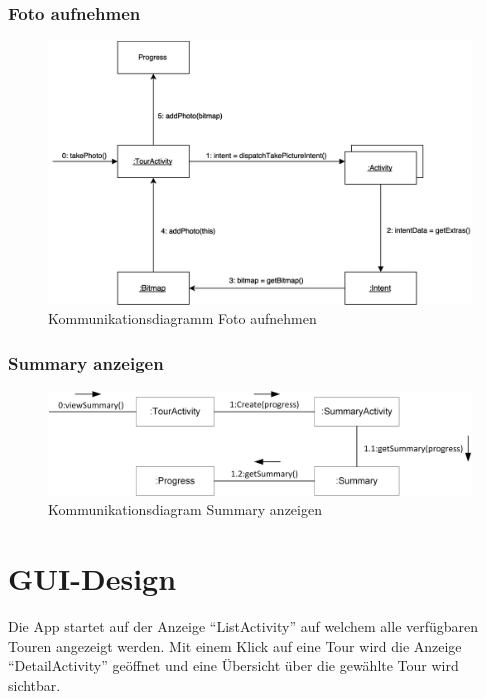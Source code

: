 \documentclass[a4paper,10pt,xetex]{article}
\begin{document}
\subsubsection{Foto aufnehmen}
\begin{figure}
  \includegraphics{Kommunikationsdiagramm_TakePhoto}
  \caption{Kommunikationsdiagramm Foto aufnehmen}
\end{figure}

\subsubsection{Summary anzeigen}
\begin{figure}
  \includegraphics{Kommunikationsdiagramm_SummaryActivity}
  \caption{Kommunikationsdiagram Summary anzeigen}
\end{figure}

\newpage
\section{GUI-Design}\label{gui-design}
Die App startet auf der Anzeige ``ListActivity'' auf welchem alle verfügbaren Touren angezeigt
werden. Mit einem Klick auf eine Tour wird die Anzeige ``DetailActivity'' geöffnet und eine
Übersicht über die gewählte Tour wird sichtbar.
\end{document}
